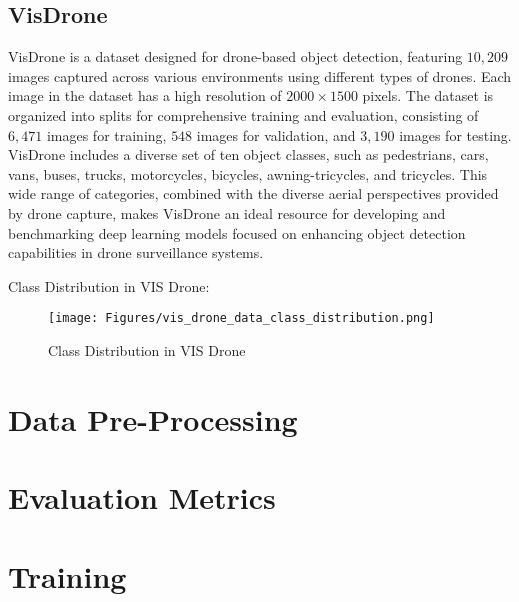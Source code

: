\subsection{VisDrone}

VisDrone is a dataset designed for drone-based object detection, featuring $10,209$ images captured across various environments using different 
types of drones. Each image in the dataset has a high resolution of $2000 \times 1500$ pixels. The dataset is organized into splits for comprehensive 
training and evaluation, consisting of $6,471$ images for training, $548$ images for validation, and $3,190$ images for testing. VisDrone includes a 
diverse set of ten object classes, such as pedestrians, cars, vans, buses, trucks, motorcycles, bicycles, awning-tricycles, and tricycles. This wide 
range of categories, combined with the diverse aerial perspectives provided by drone capture, makes VisDrone an ideal resource for developing and 
benchmarking deep learning models focused on enhancing object detection capabilities in drone surveillance systems.

Class Distribution in VIS Drone:

\begin{figure}[h!]
    \centering
    \texttt{[image: Figures/vis\_drone\_data\_class\_distribution.png]}
    \caption{Class Distribution in VIS Drone }
    \label{fig:vis-class}
\end{figure}


\section{Data Pre-Processing}





\section{Evaluation Metrics}



\section{Training}



